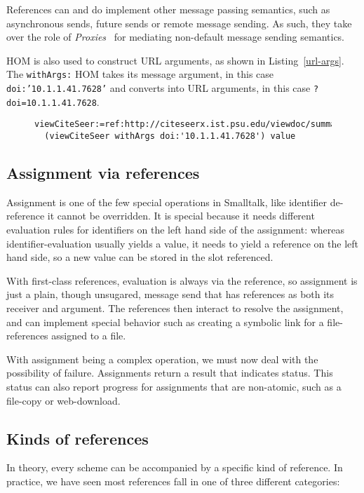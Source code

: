 \documentclass[preprint]{sigplanconf}
\begin{document}
References can and do implement other message passing semantics, such as asynchronous sends, future
sends or remote message sending.  As such, they take over the role of \emph{Proxies}~\cite{VanCutsemMiller} for mediating non-default
message sending semantics.  


HOM is also used to construct URL arguments, as shown in Listing~\ref{url-args}.  The {\tt withArgs:}
HOM takes its message argument, in this case {\tt doi:'10.1.1.41.7628'} and converts into URL arguments,
in this case {\tt ?doi=10.1.1.41.7628}.

\begin{figure}[htbp]
\begin{lstlisting}[style=numbers,label=url-args,caption=URL arguments via reference and higher order message.]
  viewCiteSeer:=ref:http://citeseerx.ist.psu.edu/viewdoc/summary.
  (viewCiteSeer withArgs doi:'10.1.1.41.7628') value
\end{lstlisting}
\end{figure}


\subsection{Assignment via references}

Assignment is one of the few special operations in Smalltalk, like identifier de-reference it cannot be overridden.
It is special because it needs different evaluation rules for identifiers on the left hand side of the assignment:
whereas identifier-evaluation usually yields a value, it needs to yield a reference on the left hand side, so
a new value can be stored in the slot referenced.

With first-class references, evaluation is always via the reference, so assignment is just a plain, though unsugared,
message send that has references as both its receiver and argument.  The references then interact to resolve
the assignment, and can implement special behavior such as creating a symbolic link for a file-references assigned
to a file.

With assignment being a complex operation, we must now deal with the possibility of failure.  Assignments 
return a result that indicates status.  This status can also report progress for assignments that are
non-atomic, such as a file-copy or web-download.



\subsection{Kinds of references}
\label{refkinds}
In theory, every scheme can be accompanied by a specific kind of reference.  In practice, we have 
seen most references fall in one of three different categories:
\end{document}
